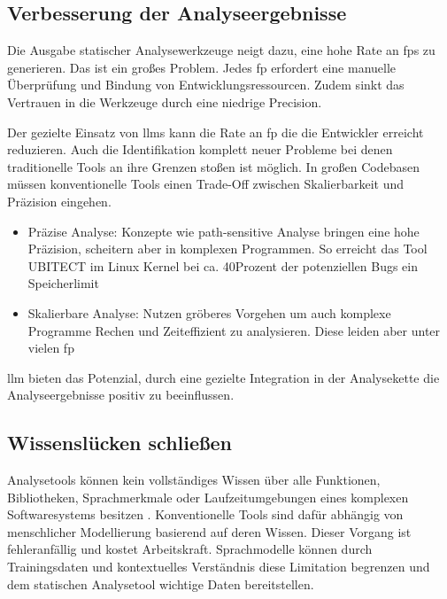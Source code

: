 \documentclass[%
    paper=A4,               %
    ngerman,
    parskip=half,           %
    11pt,                   %
    headings=normal,        %
    bibliography=totoc,     %
    listof=totoc,           %
    chapterprefix=false,    %
    appendixprefix=false,    %
    draft=false,            %
]{scrartcl}%
\begin{document}
\subsection{Verbesserung der Analyseergebnisse}

Die Ausgabe statischer Analysewerkzeuge neigt dazu, eine hohe Rate an \acfp{fp} zu generieren. Das ist ein großes Problem. Jedes \ac{fp} erfordert eine manuelle Überprüfung und Bindung von Entwicklungsressourcen. Zudem sinkt das Vertrauen in die Werkzeuge durch eine niedrige Precision\cite{wagnerEffectiveComplementarySecurity2025}.

Der gezielte Einsatz von \acp{llm} kann die Rate an \ac{fp} die die Entwickler erreicht reduzieren\cite{wagnerEffectiveComplementarySecurity2025}. Auch die Identifikation komplett neuer Probleme bei denen traditionelle Tools an ihre Grenzen stoßen ist möglich. In großen Codebasen müssen konventionelle Tools einen Trade-Off zwischen Skalierbarkeit und Präzision eingehen.

\begin{itemize}
    \item Präzise Analyse: Konzepte wie path-sensitive Analyse bringen eine hohe Präzision, scheitern aber in komplexen Programmen. So erreicht das Tool UBITECT im Linux Kernel bei ca. 40Prozent der potenziellen Bugs ein Speicherlimit\cite{liEnhancingStaticAnalysis2024}
\item Skalierbare Analyse: Nutzen gröberes Vorgehen um auch komplexe Programme Rechen und Zeiteffizient zu analysieren. Diese leiden aber unter vielen \ac{fp} 
\end{itemize} 

\ac{llm} bieten das Potenzial, durch eine gezielte Integration in der Analysekette die Analyseergebnisse positiv zu beeinflussen\cite{chapmanInterleavingStaticAnalysis2024}.

\subsection{Wissenslücken schließen}

Analysetools können kein vollständiges Wissen über alle Funktionen, Bibliotheken, Sprachmerkmale oder Laufzeitumgebungen eines komplexen Softwaresystems besitzen \cite{liEnhancingStaticAnalysis2024}. Konventionelle Tools sind dafür abhängig von menschlicher Modellierung basierend auf deren Wissen. Dieser Vorgang ist fehleranfällig und kostet Arbeitskraft\cite{liIRISLLMAssistedStatic2024}. Sprachmodelle können durch Trainingsdaten und kontextuelles Verständnis diese Limitation begrenzen und dem statischen Analysetool wichtige Daten bereitstellen\cite{liEnhancingStaticAnalysis2024}. 
\end{document}
